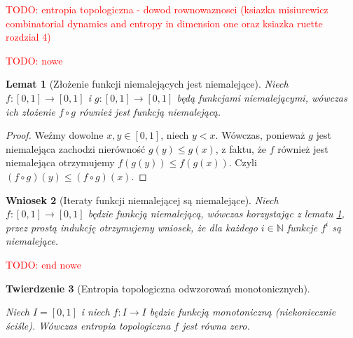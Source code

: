 \documentclass[licencjacka]{pwr_wmat_praca_dyplomowa}
\theoremstyle{plain}
\newtheorem{theorem}{Twierdzenie}
\numberwithin{theorem}{chapter}
\newtheorem{lemma}[theorem]{Lemat}
\newtheorem{corollary}[theorem]{Wniosek}
\theoremstyle{definition}
\numberwithin{theorem}{chapter}
\begin{document}
\textcolor{red}{TODO: entropia topologiczna - dowod rownowaznosci
 (ksiazka misiurewicz combinatorial dynamics and entropy in dimension one oraz ksiazka ruette rozdzial 4)}
 
 
\textcolor{red}{TODO: nowe} 
\begin{lemma}[Złożenie funkcji niemalejących jest niemalejące]
\label{zlozenie_niemalejacych_jest_niemalejace}
Niech $f: [0, 1] \rightarrow [0, 1]$ i $g: [0, 1] \rightarrow [0,1]$ będą funkcjami niemalejącymi, wówczas ich złożenie $f \circ g$ również jest funkcją niemalejącą. 
\end{lemma}

\begin{proof}
Weźmy dowolne $x, y \in [0,1]$, niech $y < x$. Wówczas, ponieważ $g$ jest niemalejąca zachodzi nierówność $g(y) \leq g(x)$, z faktu, że $f$ również jest niemalejąca otrzymujemy $f(g(y)) \leq f(g(x)).$ Czyli $(f \circ g)(y) \leq (f \circ g)(x).$
\end{proof} 
 
 
\begin{corollary}[Iteraty funkcji niemalejącej są niemalejące]
\label{iteraty_niemalejacych_sa_niemalejace}
Niech $f: [0, 1] \rightarrow [0, 1]$ będzie funkcją niemalejącą, wówczas korzystając z lematu \ref{zlozenie_niemalejacych_jest_niemalejace}, przez prostą indukcję otrzymujemy wniosek, że dla każdego $i \in \mathbb{N}$ funkcje $f^{i}$ są niemalejące.
\end{corollary}
\textcolor{red}{TODO: end nowe} 

 
 
\begin{theorem}[Entropia topologiczna odwzorowań monotonicznych]
\label{entropia_topologiczna_odwzorowan_monotonicznych}

Niech $I = [0, 1]$ i niech $f: I \rightarrow I$ będzie funkcją monotoniczną (niekoniecznie ściśle).
Wówczas entropia topologiczna $f$ jest równa zero.
\end{theorem}
\end{document}
